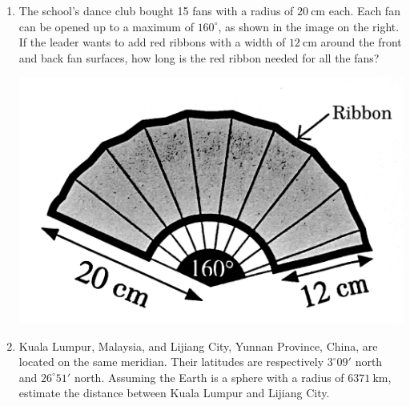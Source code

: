 \documentclass{report}
\begin{document}
\newpage


\begin{enumerate}
	\item \begin{multicols}{2}
	      The school's dance club bought 15 fans with a radius of $20 \mathrm{~cm}$ each. Each fan can be opened up to a maximum of $160^{\circ}$, as shown in the image on the right. If the leader wants to add red ribbons with a width of $12 \mathrm{~cm}$ around the front and back fan surfaces, how long is the red ribbon needed for all the fans?
	      
	      \begin{center}
	      	\includegraphics[scale=0.14]{assets/8-27.png}
	      \end{center}
	\end{multicols}
	
	\item \begin{multicols}{2}
	      Kuala Lumpur, Malaysia, and Lijiang City, Yunnan Province, China, are located on the same meridian. Their latitudes are respectively $3^\circ 09'$ north and $26^\circ 51'$ north. Assuming the Earth is a sphere with a radius of $6371 \mathrm{~km}$, estimate the distance between Kuala Lumpur and Lijiang City.
	      

\end{multicols}
\end{enumerate}
\end{document}
